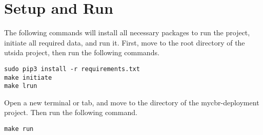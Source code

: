 \section*{Setup and Run}
The following commands will install all necessary packages to run the project, initiate all required data, and run it. First, move to the root directory of the utsida project, then run the following commands.

\begin{verbatim}
sudo pip3 install -r requirements.txt
make initiate
make lrun 
\end{verbatim}

Open a new terminal or tab, and move to the directory of the mycbr-deployment project. Then run the following command.

\begin{verbatim}
make run
\end{verbatim}

